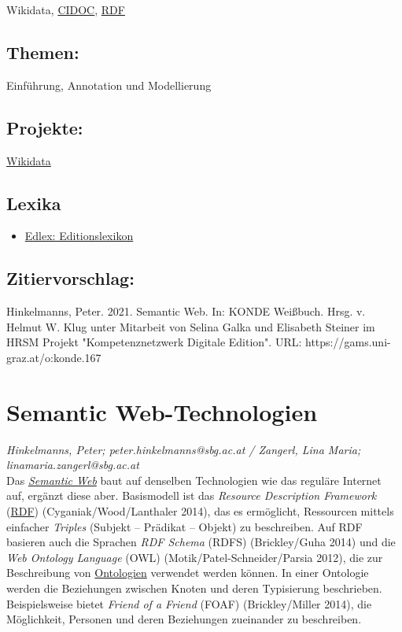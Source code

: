 \documentclass{article}
\begin{document}
{                           Wikidata}, \href{https://gams.uni-graz.at/o:konde.133}{CIDOC}, \href{https://gams.uni-graz.at/o:konde.131}{RDF}\subsection*{Themen:}Einführung, Annotation und Modellierung\subsection*{Projekte:}\href{https://www.wikidata.org/wiki/Wikidata:Main_Page}{Wikidata}\subsection*{Lexika}\begin{itemize}\item \href{https://edlex.de/index.php?title=Semantic_Web}{Edlex: Editionslexikon}\end{itemize}\subsection*{Zitiervorschlag:}Hinkelmanns, Peter. 2021. Semantic Web. In: KONDE Weißbuch. Hrsg. v. Helmut W. Klug unter Mitarbeit von Selina Galka und Elisabeth Steiner im HRSM Projekt "Kompetenznetzwerk Digitale Edition". URL: https://gams.uni-graz.at/o:konde.167\newpage\section*{Semantic Web-Technologien} \emph{Hinkelmanns, Peter; peter.hinkelmanns@sbg.ac.at / Zangerl, Lina Maria; linamaria.zangerl@sbg.ac.at }\\
        
    Das \emph{\href{http://gams.uni-graz.at/o:konde.167}{Semantic Web}} baut auf denselben Technologien wie das reguläre Internet auf, ergänzt diese aber. Basismodell ist das \emph{Resource Description Framework }(\href{http://gams.uni-graz.at/o:konde.131}{RDF}) (Cyganiak/Wood/Lanthaler 2014), das es ermöglicht, Ressourcen mittels einfacher \emph{Triples} (Subjekt – Prädikat – Objekt) zu beschreiben. Auf RDF basieren auch die Sprachen \emph{RDF Schema} (RDFS) (Brickley/Guha 2014) und die \emph{Web Ontology Language} (OWL) (Motik/Patel-Schneider/Parsia 2012), die zur Beschreibung von \href{http://gams.uni-graz.at/o:konde.151}{Ontologien} verwendet werden können. In einer Ontologie werden die Beziehungen zwischen Knoten und deren Typisierung beschrieben. Beispielsweise bietet \emph{Friend of a Friend} (FOAF) (Brickley/Miller 2014), die Möglichkeit, Personen und deren Beziehungen zueinander zu beschreiben. \\
            
\end{document}
